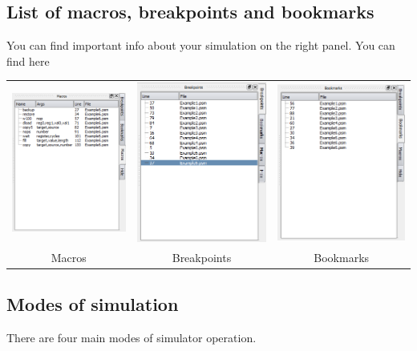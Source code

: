     \subsection{List of macros, breakpoints and bookmarks}
        You can find important info about your simulation on the right panel. You can find here
    \begin{table}[h!]
        \begin{tabular}{ccc}
            \includegraphics[width=.3\textwidth]{img/listmacros.png}
                &
            \includegraphics[width=.3\textwidth]{img/listbreakpoints.png}
                &
            \includegraphics[width=.3\textwidth]{img/listbookmarks.png}
            \\
            Macros & Breakpoints & Bookmarks
        \end{tabular}
    \end{table}


    \subsection{Modes of simulation}
        There are four main modes of simulator operation.


